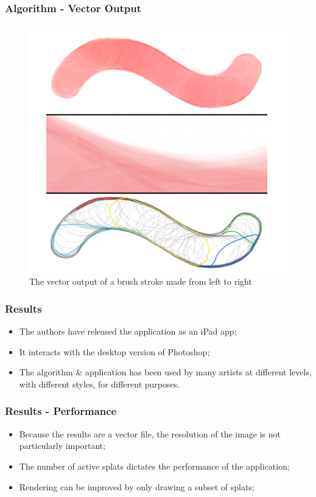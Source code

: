 \documentclass{beamer}
\begin{document}
\begin{frame}
    \frametitle{Algorithm - Vector Output}
    \begin{figure}
        \centering
        \includegraphics[width=0.5\paperwidth]{f5.png}
        \caption{\footnotesize{The vector output of a brush stroke made from
        left to right}}
    \end{figure}
\end{frame}

\begin{frame}
    \frametitle{Results}
    \begin{itemize}
        \item The authors have released the application as an iPad app;
        \item It interacts with the desktop version of Photoshop;
        \item The algorithm \& application has been used by many artists at
        different levels, with different styles, for different purposes.
    \end{itemize}
\end{frame}

\begin{frame}
    \frametitle{Results - Performance}
    \begin{itemize}
        \item Because the results are a vector file, the resolution of the
        image is not particularly important;
        \item The number of active splats dictates the performance of the
        application;
        \item Rendering can be improved by only drawing a subset of splats;
    \end{itemize}
\end{frame}
\end{document}
